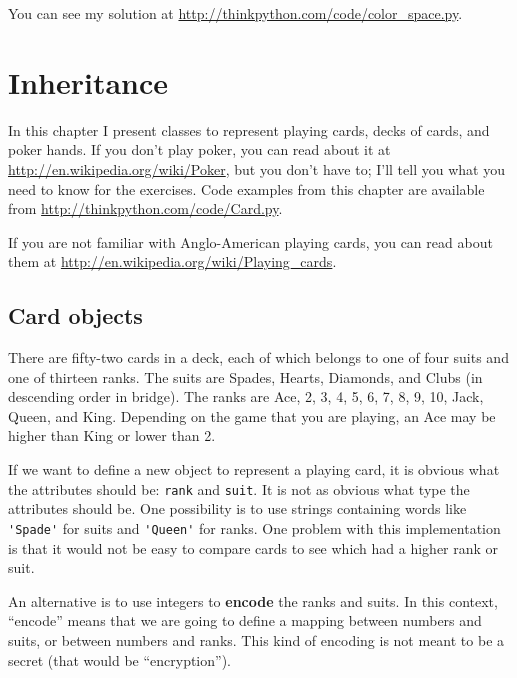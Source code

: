 \documentclass[10pt]{book}
\begin{document}
\begin{CJK}{UTF8}{gbsn}
\begin{exercise}
\begin{enumerate}
\end{enumerate}

You can see my solution at \url{http://thinkpython.com/code/color_space.py}.

\end{exercise}


\chapter{Inheritance}

In this chapter I present classes to represent playing cards,
decks of cards, and poker hands.  If you don't play poker, you can
read about it at \url{http://en.wikipedia.org/wiki/Poker}, but you don't have
to; I'll tell you what you need to know for the exercises.
Code examples from this chapter are available from
\url{http://thinkpython.com/code/Card.py}.

If you are not familiar with Anglo-American playing cards,
you can read about them at \url{http://en.wikipedia.org/wiki/Playing_cards}.


\section{Card objects}

There are fifty-two cards in a deck, each of which belongs to one of
four suits and one of thirteen ranks.  The suits are Spades, Hearts,
Diamonds, and Clubs (in descending order in bridge).  The ranks are
Ace, 2, 3, 4, 5, 6, 7, 8, 9, 10, Jack, Queen, and King.  Depending on
the game that you are playing, an Ace may be higher than King
or lower than 2.

If we want to define a new object to represent a playing card, it is
obvious what the attributes should be: {\tt rank} and
{\tt suit}.  It is not as obvious what type the attributes
should be.  One possibility is to use strings containing words like
\verb"'Spade'" for suits and \verb"'Queen'" for ranks.  One problem with
this implementation is that it would not be easy to compare cards to
see which had a higher rank or suit.

An alternative is to use integers to {\bf encode} the ranks and suits.
In this context, ``encode'' means that we are going to define a mapping
between numbers and suits, or between numbers and ranks.  This
kind of encoding is not meant to be a secret (that
would be ``encryption'').


\end{CJK}
\end{document}
